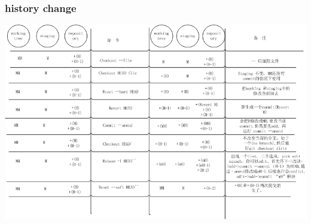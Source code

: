 \documentclass[a4paper,11pt,twoside]{book}
\begin{document}
\subsubsection{history change}
\includegraphics[scale=0.6]{pics/Git-history} \\
\end{document}
